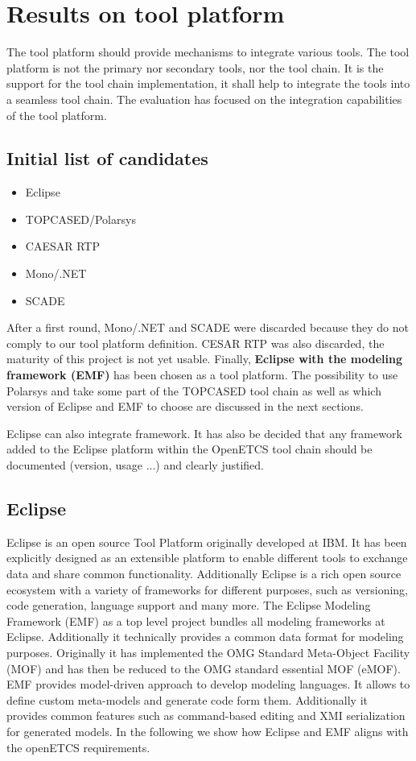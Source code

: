 
\chapter{Results on tool platform}
The tool platform should provide mechanisms to integrate various
tools. The tool platform is not the primary nor secondary tools, nor
the tool chain. It is the support for the tool chain implementation,
it shall help to integrate the tools into a seamless tool chain.
The evaluation has focused on the integration capabilities of the tool platform.

\section{Initial list of candidates}
\begin{itemize}
\item Eclipse 
\item TOPCASED/Polarsys
\item CAESAR RTP
\item Mono/.NET 
\item SCADE
\end{itemize}

After a first round, Mono/.NET and SCADE were discarded because they do
not comply to our tool platform definition.  CESAR RTP was also
discarded, the maturity of this project is not yet usable. Finally,
{\bf Eclipse with the modeling framework (EMF)} has been chosen as a tool
platform. The possibility to use Polarsys and take some part of the
TOPCASED tool chain as well as which version of Eclipse  and EMF to choose are
discussed in the next sections.  

Eclipse can also integrate framework. It has also be decided that any
framework added to the Eclipse platform within the OpenETCS tool chain
should be documented (version, usage ...) and clearly justified.

\section{Eclipse}
Eclipse is an open source Tool Platform originally developed at
IBM. It has been explicitly designed as an extensible platform to
enable different tools to exchange data and share common
functionality. Additionally Eclipse is a rich open source ecosystem
with a variety of frameworks for different purposes, such as
versioning, code generation, language support and many more. The
Eclipse Modeling Framework (EMF) as a top level project bundles all
modeling frameworks at Eclipse. Additionally it technically provides a
common data format for modeling purposes. Originally it has
implemented the OMG Standard Meta-Object Facility (MOF) and has then
be reduced to the OMG standard essential MOF (eMOF). EMF provides
model-driven approach to develop modeling languages. It allows to
define custom meta-models and generate code form them. Additionally it
provides common features such as command-based editing and XMI
serialization for generated models. In the following we show how
Eclipse and EMF aligns with the openETCS requirements.


